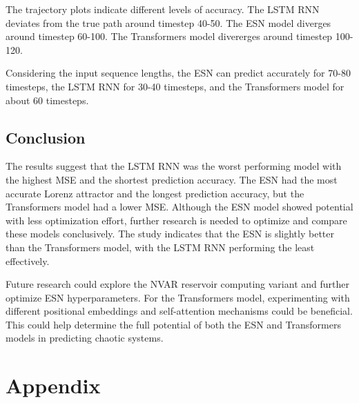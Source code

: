 \documentclass[11pt]{article}
\begin{document}
The trajectory plots indicate different levels of accuracy. The LSTM RNN deviates from the true path around timestep 40-50. The ESN model diverges around timestep 60-100. The Transformers model divererges around timestep 100-120.

Considering the input sequence lengths, the ESN can predict accurately for 70-80 timesteps, the LSTM RNN for 30-40 timesteps, and the Transformers model for about 60 timesteps.

\subsection{Conclusion}
The results suggest that the LSTM RNN was the worst performing model with the highest MSE and the shortest prediction accuracy. The ESN had the most accurate Lorenz attractor and the longest prediction accuracy, but the Transformers model had a lower MSE. Although the ESN model showed potential with less optimization effort, further research is needed to optimize and compare these models conclusively. The study indicates that the ESN is slightly better than the Transformers model, with the LSTM RNN performing the least effectively.

Future research could explore the NVAR reservoir computing variant and further optimize ESN hyperparameters. For the Transformers model, experimenting with different positional embeddings and self-attention mechanisms could be beneficial. This could help determine the full potential of both the ESN and Transformers models in predicting chaotic systems.

\appendix
\section*{Appendix}
\end{document}
